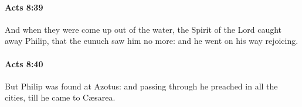 		\paragraph{Acts 8:39} %
			\label{ACTS-8-39}

			And when they were come up out of the water, the Spirit of the Lord caught away Philip, that the eunuch saw him no more: and he went on his way rejoicing.

			\begin{framed}
			\scriptsize
				\begin{compactdesc}
					\item[SBLG] 
				\end{compactdesc}
			\end{framed}

		\paragraph{Acts 8:40} %
			\label{ACTS-8-40}

			But Philip was found at Azotus: and passing through he preached in all the cities, till he came to Cæsarea.

